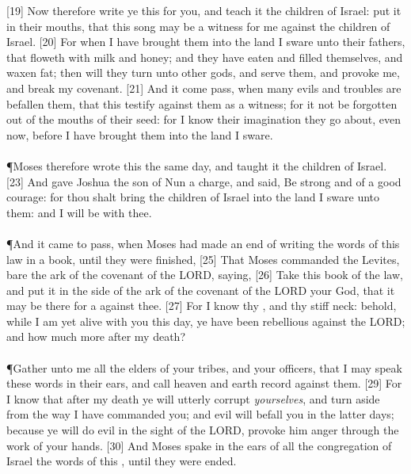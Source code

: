 [19] \textcolor[cmyk]{0.99998,1,0,0}{Now therefore write ye this  for you, and teach it the children of Israel: put it in their mouths, that this song may be a witness for me against the children of Israel.}
[20] \textcolor[cmyk]{0.99998,1,0,0}{For when I  have brought them into the land    I sware unto their fathers, that floweth with milk and honey; and they  have eaten and filled themselves, and waxen fat; then will they turn unto other gods, and serve them, and provoke me, and break my covenant.}
[21] \textcolor[cmyk]{0.99998,1,0,0}{And it  come   pass, when many evils and troubles are befallen them, that this   testify against them as a witness; for it  not be forgotten out of the mouths of their seed: for I know their imagination    they go about, even now, before I have brought them into the land    I sware.}\\
\\
\P \textcolor[cmyk]{0.99998,1,0,0}{Moses therefore wrote this  the same day, and taught it the children of Israel.}
[23] \textcolor[cmyk]{0.99998,1,0,0}{And  gave Joshua the son of Nun a charge, and said, Be strong and of a good courage: for thou shalt bring the children of Israel into the land    I sware unto them: and I will be with thee.}\\
\\
\P \textcolor[cmyk]{0.99998,1,0,0}{And it came to pass, when Moses had made an end of writing the words of this law in a book, until they were finished,}
[25] \textcolor[cmyk]{0.99998,1,0,0}{That Moses commanded the Levites,    bare the ark of the covenant of the LORD, saying,}
[26] \textcolor[cmyk]{0.99998,1,0,0}{Take this book of the law, and put it in the side of the ark of the covenant of the LORD your God, that it may be there for a  against thee.}
[27] \textcolor[cmyk]{0.99998,1,0,0}{For I know thy , and thy stiff neck: behold, while I am yet alive with you this day, ye have been rebellious against the LORD; and how much more after my death?}\\
\\
\P \textcolor[cmyk]{0.99998,1,0,0}{Gather unto me all the elders of your tribes, and your officers, that I may speak these words in their ears, and call heaven and earth   record against them.}
[29] \textcolor[cmyk]{0.99998,1,0,0}{For I know that after my death ye will utterly corrupt \emph{yourselves}, and turn aside from the way    I have commanded you; and evil will befall you in the latter days; because ye will do evil in the sight of the LORD,   provoke him   anger through the work of your hands.}
[30] \textcolor[cmyk]{0.99998,1,0,0}{And Moses spake in the ears of all the congregation of Israel the words of this , until they were ended.}